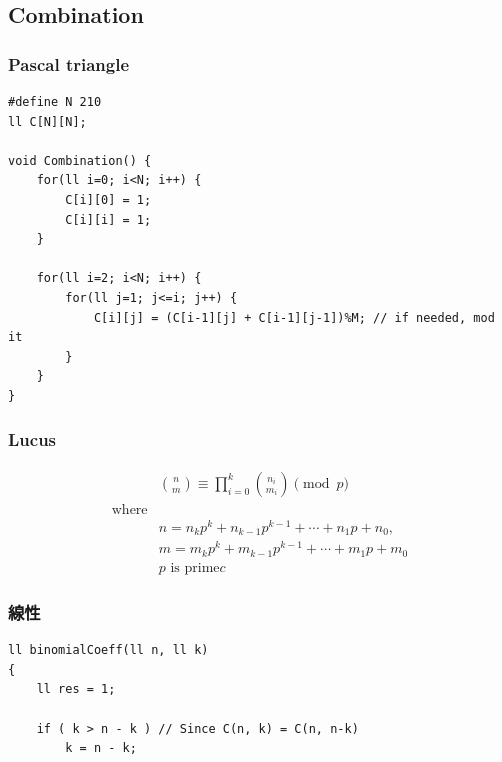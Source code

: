 \documentclass[10pt,oneside]{article}
\begin{document}
\begin{landscape}
\begin{multicols}{2}

\subsection{Combination}

\subsubsection{Pascal triangle}

\begin{verbatim}
#define N 210
ll C[N][N];

void Combination() {
    for(ll i=0; i<N; i++) {
        C[i][0] = 1;
        C[i][i] = 1;
    }

    for(ll i=2; i<N; i++) {
        for(ll j=1; j<=i; j++) {
            C[i][j] = (C[i-1][j] + C[i-1][j-1])%M; // if needed, mod it
        }
    }
}
\end{verbatim}

\subsubsection{Lucus}

\begin{equation}
\begin{split}&\binom{n}{m} \equiv \prod_{i=0}^k \binom{n_i}{m_i} \pmod p \\
\text{where}& \\
&n = n_kp^k+n_{k-1}p^{k-1}+\cdots +n_1p+n_0, \\
&m = m_kp^k+m_{k-1}p^{k-1}+\cdots +m_1p+m_0 \\
&p \text{ is prime}
c\end{split}
\end{equation}


\subsubsection{線性}

\begin{verbatim}
ll binomialCoeff(ll n, ll k)
{
    ll res = 1;
 
    if ( k > n - k ) // Since C(n, k) = C(n, n-k)
        k = n - k;
 

\end{verbatim}
\end{multicols}
\end{landscape}
\end{document}
